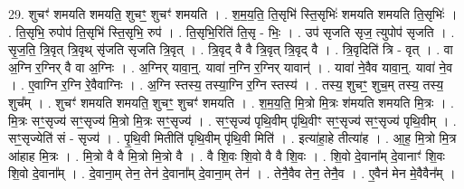 \documentclass[17pt]{extarticle}
\begin{document}
29. शुचꣳ॑ शमयति शमयति॒ शुचꣳ॒॒ शुचꣳ॑ शमयति । . श॒म॒य॒ति॒ ति॒सृभि॑ स्ति॒सृभिः॑ शमयति शमयति ति॒सृभिः॑ । . ति॒सृभि॒ रुपोप॑ ति॒सृभि॑ स्ति॒सृभि॒ रुप॑ । . ति॒सृभि॒रिति॑ ति॒सृ - भिः॒ । . उप॑ सृजति सृज॒ त्युपोप॑ सृजति । . सृ॒ज॒ति॒ त्रि॒वृत् त्रि॒वृथ् सृ॑जति सृजति त्रि॒वृत् । . त्रि॒वृद् वै वै त्रि॒वृत् त्रि॒वृद् वै । . त्रि॒वृदिति॑ त्रि - वृत् । . वा अ॒ग्नि र॒ग्निर् वै वा अ॒ग्निः । . अ॒ग्निर् यावा॒न्॒. यावा॑ न॒ग्नि र॒ग्निर् यावान्॑ । . यावा॑ ने॒वैव यावा॒न्॒. यावा॑ ने॒व । . ए॒वाग्नि र॒ग्नि रे॒वैवाग्निः । . अ॒ग्नि स्तस्य॒ तस्या॒ग्नि र॒ग्नि स्तस्य॑ । . तस्य॒ शुचꣳ॒॒ शुच॒म् तस्य॒ तस्य॒ शुच᳚म् । . शुचꣳ॑ शमयति शमयति॒ शुचꣳ॒॒ शुचꣳ॑ शमयति । . श॒म॒य॒ति॒ मि॒त्रो मि॒त्रः श॑मयति शमयति मि॒त्रः । . मि॒त्रः सꣳ॒॒सृज्य॑ सꣳ॒॒सृज्य॑ मि॒त्रो मि॒त्रः सꣳ॒॒सृज्य॑ । . सꣳ॒॒सृज्य॑ पृथि॒वीम् पृ॑थि॒वीꣳ सꣳ॒॒सृज्य॑ सꣳ॒॒सृज्य॑ पृथि॒वीम् । . सꣳ॒॒सृज्येति॑ सं - सृज्य॑ । . पृ॒थि॒वी मितीति॑ पृथि॒वीम् पृ॑थि॒वी मिति॑ । . इत्या॑हा॒हे तीत्या॑ह । . आ॒ह॒ मि॒त्रो मि॒त्र आ॑हाह मि॒त्रः । . मि॒त्रो वै वै मि॒त्रो मि॒त्रो वै । . वै शि॒वः शि॒वो वै वै शि॒वः । . शि॒वो दे॒वाना᳚म् दे॒वानाꣳ॑ शि॒वः शि॒वो दे॒वाना᳚म् । . दे॒वाना॒म् तेन॒ तेन॑ दे॒वाना᳚म् दे॒वाना॒म् तेन॑ । . तेनै॒वैव तेन॒ तेनै॒व । . ए॒वैन॑ मेन मे॒वैवैन᳚म् । \newline
\end{document}
